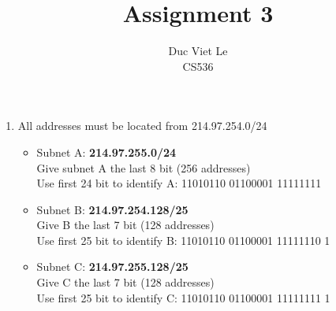 \documentclass[11pt]{article}
\newenvironment{problem}[2][Problem]{\begin{trivlist}
\item[\hskip \labelsep {\bfseries #1}\hskip \labelsep {\bfseries #2.}]}{\end{trivlist}}
\begin{document}
\title{Assignment 3}
\author{Duc Viet Le\\ CS536}
 
\maketitle

\begin{problem}{1}
\end{problem}
\begin{enumerate}
	\item All addresses must be located from 214.97.254.0/24
	\begin{itemize}
		\item Subnet A: \textbf{214.97.255.0/24}
		\\Give subnet A the last 8 bit (256 addresses)
		\\Use first 24 bit to identify A: 11010110 01100001 11111111
		\item Subnet B: \textbf{214.97.254.128/25}
		\\
		Give B the  last 7 bit (128 addresses)\\
		Use first 25 bit to identify B: 11010110 01100001 11111110 1
		\item Subnet C: \textbf{214.97.255.128/25}
		\\ Give C the  last 7 bit (128 addresses)\\
		Use first 25 bit to identify C: 11010110 01100001 11111111 1


\end{itemize}
\end{enumerate}
\end{document}
